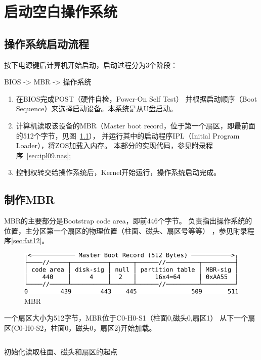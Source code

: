 \chapter{启动空白操作系统}

\section{操作系统启动流程}

按下电源键后计算机开始启动，启动过程分为3个阶段\cite{阮一峰2014如何变得有思想}：
\begin{center}BIOS -> MBR -> 操作系统\end{center}

\begin{enumerate}
\item 在BIOS完成POST（硬件自检，Power-On Self Test）
  并根据启动顺序（Boot Sequence）来选择启动设备。本系统是从U盘启动。
\item 计算机读取该设备的MBR（Master boot record，位于第一个扇区，即最前面的512个字节，见图~\ref{fig:mbr}），
  并运行其中的启动程序IPL（Initial Program Loader），将ZOS加载入内存。
  本部分的实现代码，参见附录程序~\ref{sec:ipl09.nas};
\item 控制权转交给操作系统后，Kernel开始运行，操作系统启动完成。
\end{enumerate}

\section{制作MBR}

MBR的主要部分是Bootstrap code area，即前446个字节。
负责指出操作系统的位置，主分区第一个扇区的物理位置（柱面、磁头、扇区号等等）
，参见附录程序\ref{sec:fat12}。

\begin{figure}[H]
  \centering
  \includegraphics[width=1\textwidth]{fig/mbr.pdf}
  \caption{MBR}
  \label{fig:mbr}
\end{figure}

一个扇区大小为512字节，MBR位于C0-H0-S1（柱面0,磁头0,扇区1）\cite{刘伟2010数据恢复技术深度揭秘}
从下一个扇区(C0-H0-S2，柱面0，磁头0，扇区2)开始加载。

\begin{listing}[H]
  \inputminted[tabsize=2, firstline=43, lastline=45,
  linenos=true]{nasm}{../ZOS/src/kernel/ipl09.nas}
  \caption{初始化读取柱面、磁头和扇区的起点}
  \label{sec:chs}
\end{listing}

